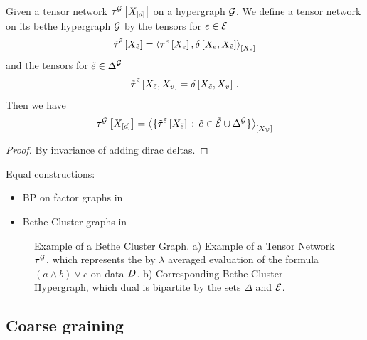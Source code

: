 \begin{lemma}\label{lem:betheInvariance}
    Given a tensor network $\tau^{\mathcal{G}}\left[X_{[d]}\right]$ on a hypergraph $\mathcal{G}$.
    We define a tensor network on its bethe hypergraph $\tilde{\mathcal{G}}$ by the tensors for $e\in\mathcal{E}$
    \begin{align*}
        \tilde{\tau}^{\tilde{e}}\left[X_{\tilde{e}}\right]
        = \left\langle \tau^{e}\left[X_{e}\right],\delta\left[X_{e},X_{\tilde{e}}\right]\right\rangle_{\left[ X_{\tilde{e}} \right]}
    \end{align*}
    and the tensors for $\tilde{e}\in\Delta^{\mathcal{G}}$
    \begin{align*}
        \tilde{\tau}^{\tilde{e}}\left[X_{\tilde{e}},X_{v}\right]
        = \delta\left[X_{\tilde{e}},X_{v}\right] \, .
    \end{align*}
    Then we have
    \begin{align*}
        \tau^{\mathcal{G}}\left[X_{[d]}\right] =
        \left\langle \{\tilde{\tau}^{\tilde{e}}\left[X_{\tilde{e}}\right] \,:\, \tilde{e}\in\tilde{\mathcal{E}} \cup \Delta^{\mathcal{G}}\}\right\rangle_{\left[ X_{\mathcal{V}} \right]}
    \end{align*}
\end{lemma}
\begin{proof}
    By invariance of adding dirac deltas.
\end{proof}

Equal constructions:
\begin{itemize}
    \item BP on factor graphs in \cite{mezard_information_2009}
    \item Bethe Cluster graphs in \cite{koller_probabilistic_2009}
\end{itemize}

\begin{figure}[t]
    \begin{center}
        
    \end{center}
    \caption{Example of a Bethe Cluster Graph.
    a) Example of a Tensor Network $\tau^{\mathcal{G}}$, which represents the by $\lambda$ averaged evaluation of the formula $(a\land b)\lor c$ on data $D$.
    b) Corresponding Bethe Cluster Hypergraph, which dual is bipartite by the sets $\Delta$ and $\tilde{\mathcal{E}}$.
    }
    \label{fig:betheDataExample}
\end{figure}

\subsection{Coarse graining}

